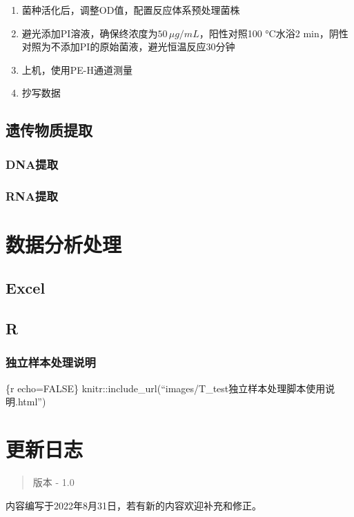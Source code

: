 \documentclass[
]{book}
\providecommand{\tightlist}{%
  \setlength{\itemsep}{0pt}\setlength{\parskip}{0pt}}
\begin{document}
\begin{enumerate}
\def\labelenumi{\arabic{enumi}.}
\tightlist
\item
  菌种活化后，调整OD值，配置反应体系预处理菌株
\item
  避光添加PI溶液，确保终浓度为\(50\,\mu g/mL\)，阳性对照100 °C水浴2 min，阴性对照为不添加PI的原始菌液，避光恒温反应30分钟
\item
  上机，使用PE-H通道测量
\item
  抄写数据
\end{enumerate}

\hypertarget{ux9057ux4f20ux7269ux8d28ux63d0ux53d6}{%
\section{遗传物质提取}\label{ux9057ux4f20ux7269ux8d28ux63d0ux53d6}}

\hypertarget{dnaux63d0ux53d6}{%
\subsection{DNA提取}\label{dnaux63d0ux53d6}}

\hypertarget{rnaux63d0ux53d6}{%
\subsection{RNA提取}\label{rnaux63d0ux53d6}}

\hypertarget{dataanalysis}{%
\chapter{数据分析处理}\label{dataanalysis}}

\hypertarget{excel}{%
\section{Excel}\label{excel}}

\hypertarget{r}{%
\section{R}\label{r}}

\hypertarget{ux72ecux7acbux6837ux672cux5904ux7406ux8bf4ux660e}{%
\subsection{独立样本处理说明}\label{ux72ecux7acbux6837ux672cux5904ux7406ux8bf4ux660e}}

\{r echo=FALSE\}
knitr::include\_url(``images/T\_test独立样本处理脚本使用说明.html'')

\hypertarget{appendix-ux9644ux5f55}{%
\appendix}


\hypertarget{updatelog}{%
\chapter{更新日志}\label{updatelog}}

\begin{quote}
版本 - 1.0
\end{quote}

内容编写于2022年8月31日，若有新的内容欢迎补充和修正。

\printbibliography
\end{document}
